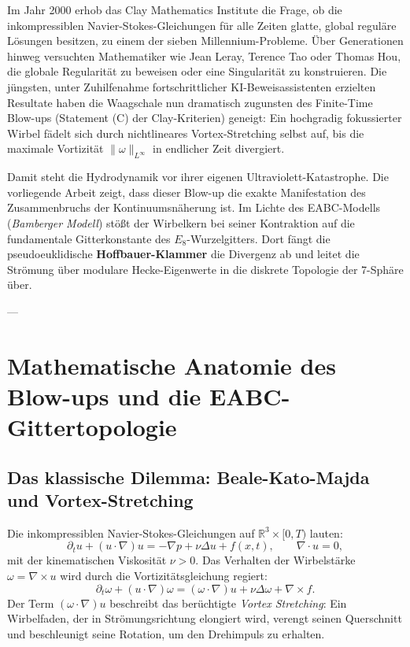 \documentclass[11pt,a4paper]{article}
\begin{document}
Im Jahr 2000 erhob das Clay Mathematics Institute die Frage, ob die inkompressiblen Navier-Stokes-Gleichungen für alle Zeiten glatte, global reguläre Lösungen besitzen, zu einem der sieben Millennium-Probleme. Über Generationen hinweg versuchten Mathematiker wie Jean Leray, Terence Tao oder Thomas Hou, die globale Regularität zu beweisen oder eine Singularität zu konstruieren. Die jüngsten, unter Zuhilfenahme fortschrittlicher KI-Beweisassistenten erzielten Resultate haben die Waagschale nun dramatisch zugunsten des Finite-Time Blow-ups (Statement (C) der Clay-Kriterien) geneigt: Ein hochgradig fokussierter Wirbel fädelt sich durch nichtlineares Vortex-Stretching selbst auf, bis die maximale Vortizität $\|\omega\|_{L^\infty}$ in endlicher Zeit divergiert.

Damit steht die Hydrodynamik vor ihrer eigenen Ultraviolett-Katastrophe. Die vorliegende Arbeit zeigt, dass dieser Blow-up die exakte Manifestation des Zusammenbruchs der Kontinuumsnäherung ist. Im Lichte des EABC-Modells (\emph{Bamberger Modell}) stößt der Wirbelkern bei seiner Kontraktion auf die fundamentale Gitterkonstante des $E_8$-Wurzelgitters. Dort fängt die pseudoeuklidische \textbf{Hoffbauer-Klammer} die Divergenz ab und leitet die Strömung über modulare Hecke-Eigenwerte in die diskrete Topologie der 7-Sphäre über.

---

\section{Mathematische Anatomie des Blow-ups und die EABC-Gittertopologie}

\subsection{Das klassische Dilemma: Beale-Kato-Majda und Vortex-Stretching}

Die inkompressiblen Navier-Stokes-Gleichungen auf $\mathbb{R}^3 \times [0, T)$ lauten:
\begin{equation}
\partial_t u + (u \cdot \nabla) u = -\nabla p + \nu \Delta u + f(x,t), \qquad \nabla \cdot u = 0,
\end{equation}
mit der kinematischen Viskosität $\nu > 0$. Das Verhalten der Wirbelstärke $\omega = \nabla \times u$ wird durch die Vortizitätsgleichung regiert:
\begin{equation}
\partial_t \omega + (u \cdot \nabla) \omega = (\omega \cdot \nabla) u + \nu \Delta \omega + \nabla \times f.
\end{equation}
Der Term $(\omega \cdot \nabla) u$ beschreibt das berüchtigte \emph{Vortex Stretching}: Ein Wirbelfaden, der in Strömungsrichtung elongiert wird, verengt seinen Querschnitt und beschleunigt seine Rotation, um den Drehimpuls zu erhalten. 
\end{document}
